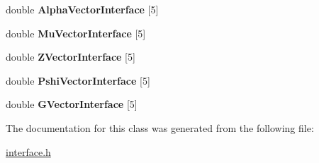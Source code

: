 \begin{DoxyCompactItemize}
\item 
double {\bfseries Alpha\+Vector\+Interface} \mbox{[}5\mbox{]}\hypertarget{classinterface_aa3f54ad5bd8d3081383f2190090b4109}{}\label{classinterface_aa3f54ad5bd8d3081383f2190090b4109}

\item 
double {\bfseries Mu\+Vector\+Interface} \mbox{[}5\mbox{]}\hypertarget{classinterface_aa740f1171fcddcb604c237cabbcebc1a}{}\label{classinterface_aa740f1171fcddcb604c237cabbcebc1a}

\item 
double {\bfseries Z\+Vector\+Interface} \mbox{[}5\mbox{]}\hypertarget{classinterface_a32902e62056c2479ade3f78167f1522f}{}\label{classinterface_a32902e62056c2479ade3f78167f1522f}

\item 
double {\bfseries Pshi\+Vector\+Interface} \mbox{[}5\mbox{]}\hypertarget{classinterface_a37044e7a6a8820ea4bcbcaf969628238}{}\label{classinterface_a37044e7a6a8820ea4bcbcaf969628238}

\item 
double {\bfseries G\+Vector\+Interface} \mbox{[}5\mbox{]}\hypertarget{classinterface_ab25dbd2f7aaa6921fd5edb973af98ed4}{}\label{classinterface_ab25dbd2f7aaa6921fd5edb973af98ed4}

\end{DoxyCompactItemize}


The documentation for this class was generated from the following file\+:\begin{DoxyCompactItemize}
\item 
\hyperlink{interface_8h}{interface.\+h}\end{DoxyCompactItemize}
